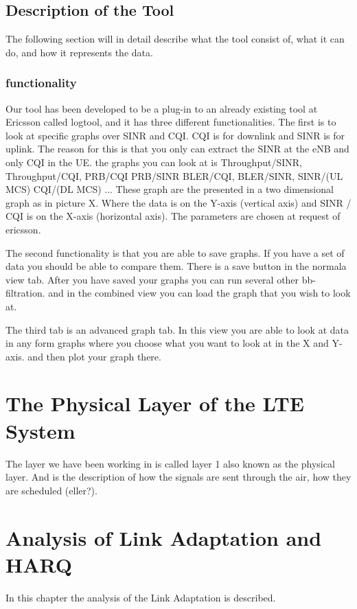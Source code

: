 \documentclass[cropmarks, frame, english]{idamasterthesis}
\begin{document}
\section{Description of the Tool}
The following section will in detail describe what the tool consist of, what it can do, and how it represents the data.

\subsection{functionality}
Our tool has been developed to be a plug-in to an already existing tool at Ericsson called logtool, and it has three different functionalities. The first is to look at specific graphs over SINR and CQI. CQI is for downlink and SINR is for uplink. The reason for this is that you only can extract the SINR at the eNB and only CQI in the UE. the graphs you can look at is Throughput/SINR, Throughput/CQI, PRB/CQI PRB/SINR BLER/CQI, BLER/SINR, SINR/(UL MCS) CQI/(DL MCS) ... These graph are the presented in a two dimensional graph as in picture X. Where the data is on the Y-axis (vertical axis) and SINR / CQI is on the X-axis (horizontal axis). The parameters are chosen at request of ericsson. 

The second functionality is that you are able to save graphs. If you have a set of data you should be able to compare them. There is a save button in the normala view tab. After you have saved your graphs you can run several other bb-filtration. and in the combined view you can load the graph that you wish to look at.

The third tab is an advanced graph tab. In this view you are able to look at data in any form graphs where you choose what you want to look at in the X and Y-axis. and then plot your graph there.
\chapter{The Physical Layer of the LTE System}
The layer we have been working in is called layer 1 also known as the physical layer. And is the description of how the signals are sent through the air, how they are scheduled (eller?).
 
\chapter{Analysis of Link Adaptation and HARQ}
In this chapter the analysis of the Link Adaptation is described. 
\end{document}
